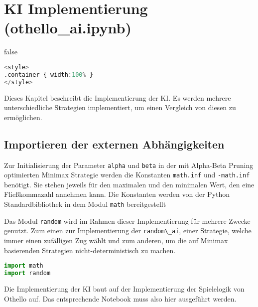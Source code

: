 \hypertarget{ki-implementierung-othello_ai.ipynb}{%
\section{KI Implementierung
(othello\_ai.ipynb)}\label{ki-implementierung-othello_ai.ipynb}}

\label{sec:aiimpl} \ifx false

\begin{lstlisting}[language=Python]
%%HTML
<style>
.container { width:100% }
</style>
\end{lstlisting}

\fi

Dieses Kapitel beschreibt die Implementierung der \ac{KI}. Es werden
mehrere unterschiedliche Strategien implementiert, um einen Vergleich
von diesen zu ermöglichen.

\hypertarget{importieren-der-externen-abhuxe4ngigkeiten}{%
\subsection{Importieren der externen
Abhängigkeiten}\label{importieren-der-externen-abhuxe4ngigkeiten}}

Zur Initialisierung der Parameter \passthrough{\lstinline!alpha!} und
\passthrough{\lstinline!beta!} in der mit Alpha-Beta Pruning optimierten
Minimax Strategie werden die Konstanten
\passthrough{\lstinline!math.inf!} und
\passthrough{\lstinline!-math.inf!} benötigt. Sie stehen jeweils für den
maximalen und den minimalen Wert, den eine Fließkommazahl annehmen kann.
Die Konstanten werden von der Python Standardbibliothek in dem Modul
\passthrough{\lstinline!math!} bereitgestellt

Das Modul \passthrough{\lstinline!random!} wird im Rahmen dieser
Implementierung für mehrere Zwecke genutzt. Zum einen zur
Implementierung der \passthrough{\lstinline!random\_ai!}, einer
Strategie, welche immer einen zufälligen Zug wählt und zum anderen, um
die auf Minimax basierenden Strategien nicht-deterministisch zu machen.

\begin{lstlisting}[language=Python]
import math
import random
\end{lstlisting}

Die Implementierung der \ac{KI} baut auf der Implementierung der
Spielelogik von Othello auf. Das entsprechende Notebook muss also hier
ausgeführt werden.

\begin{lstlisting}[language=Python]
%run othello_game.ipynb
\end{lstlisting}

